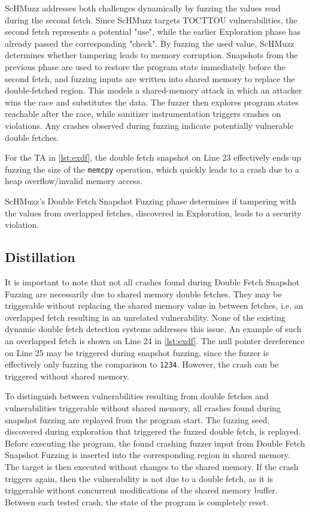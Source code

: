 \documentclass[letterpaper,twocolumn,10pt]{article}
\newcommand{\sysname}{ScHMuzz\xspace}
\newcommand{\stageone}{Exploration\xspace}
\newcommand{\stagetwo}{Double Fetch Snapshot Fuzzing\xspace}
\newcommand{\stagethree}{Distillation\xspace}
\begin{document}
\sysname addresses both challenges dynamically by fuzzing the values read during the second fetch. 
Since \sysname targets TOCTTOU vulnerabilities, the second fetch represents a potential "use", while the 
earlier \stageone phase has already passed the corresponding "check". By fuzzing the used value, 
\sysname determines whether tampering leads to memory corruption. Snapshots from the previous phase 
are used to restore the program state immediately before the second fetch, and fuzzing inputs are 
written into shared memory to replace the double-fetched region. This models a shared-memory attack 
in which an attacker wins the race and substitutes the data. The fuzzer then explores program states 
reachable after the race, while sanitizer instrumentation triggers crashes on violations. Any crashes 
observed during fuzzing indicate potentially vulnerable double fetches.

For the TA in \autoref{lst:exdf}, the double fetch snapshot on Line 23 
effectively ends up fuzzing the size of the \texttt{memcpy} operation, which 
quickly leads to a crash due to a heap overflow/invalid memory access.

\begin{tcolorbox}
    \sysname's \stagetwo phase determines if tampering with the values from overlapped fetches, discovered in \stageone, 
    leads to a security violation.
\end{tcolorbox}

\subsection{\stagethree}
It is important to note that not all crashes found during \stagetwo are necessarily 
due to shared memory double fetches. They may be triggerable without replacing the shared 
memory value in between fetches, i.e, an overlapped fetch resulting in an unrelated vulnerability. 
None of the existing dynamic double fetch detection systems addresses this issue.
An example of such an overlapped fetch is shown on Line 24 in \autoref{lst:exdf}. The null 
pointer dereference on Line 25 may be triggered during snapshot fuzzing, since the fuzzer 
is effectively only fuzzing the comparison to \texttt{1234}.
However, the crash can be triggered without shared memory.

To distinguish between vulnerabilities resulting from double fetches and vulnerabilities triggerable 
without shared memory, all crashes found during snapshot fuzzing are replayed from the 
program start. The fuzzing seed, discovered during exploration that triggered the fuzzed 
double fetch, is replayed. Before executing the program, the found crashing fuzzer input from 
\stagetwo is inserted into the corresponding region in shared memory. The target is then executed 
without changes to the shared memory.
If the crash triggers again, then the vulnerability is not due to a double fetch, as it is 
triggerable without concurrent modifications of the shared memory buffer. Between each tested crash, 
the state of the program is completely reset. 
\end{document}
